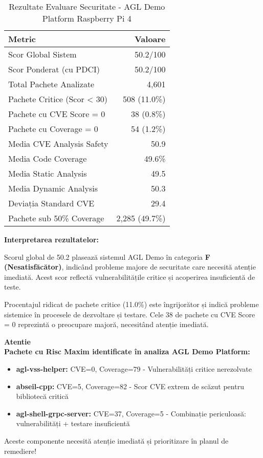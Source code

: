 \documentclass[12pt,a4paper]{article}
\newenvironment{warningbox}{%
\begin{leftbar}
\color{black}
\textbf{Atentie}\\[0.5em]
}{%
\end{leftbar}
}
\begin{document}
\begin{table}[H]
\centering
\caption{Rezultate Evaluare Securitate - AGL Demo Platform Raspberry Pi 4}
\begin{tabular}{@{}lr@{}}
\toprule
\textbf{Metric} & \textbf{Valoare} \\
\midrule
Scor Global Sistem & 50.2/100 \\
Scor Ponderat (cu PDCI) & 50.2/100 \\
Total Pachete Analizate & 4,601 \\
Pachete Critice (Scor < 30) & 508 (11.0\%) \\
Pachete cu CVE Score = 0 & 38 (0.8\%) \\
Pachete cu Coverage = 0 & 54 (1.2\%) \\
Media CVE Analysis Safety & 50.9 \\
Media Code Coverage & 49.6\% \\
Media Static Analysis & 49.5 \\
Media Dynamic Analysis & 50.3 \\
Deviația Standard CVE & 29.4 \\
Pachete sub 50\% Coverage & 2,285 (49.7\%) \\
\bottomrule
\end{tabular}
\end{table}

\textbf{Interpretarea rezultatelor:}

Scorul global de 50.2 plasează sistemul AGL Demo în categoria \textbf{F (Nesatisfăcător)}, indicând probleme majore de securitate care necesită atenție imediată. Acest scor reflectă vulnerabilitățile critice și acoperirea insuficientă de teste.

Procentajul ridicat de pachete critice (11.0\%) este îngrijorător și indică probleme sistemice în procesele de dezvoltare și testare. Cele 38 de pachete cu CVE Score = 0 reprezintă o preocupare majoră, necesitând atenție imediată.

\begin{warningbox}
\textbf{Pachete cu Risc Maxim identificate în analiza AGL Demo Platform:}

\begin{itemize}
\item \textbf{agl-vss-helper:} CVE=0, Coverage=79 - Vulnerabilități critice nerezolvate
\item \textbf{abseil-cpp:} CVE=5, Coverage=82 - Scor CVE extrem de scăzut pentru bibliotecă critică
\item \textbf{agl-shell-grpc-server:} CVE=37, Coverage=5 - Combinație periculoasă: vulnerabilități + testare insuficientă
\end{itemize}

Aceste componente necesită atenție imediată și prioritizare în planul de remediere!
\end{warningbox}
\end{document}
